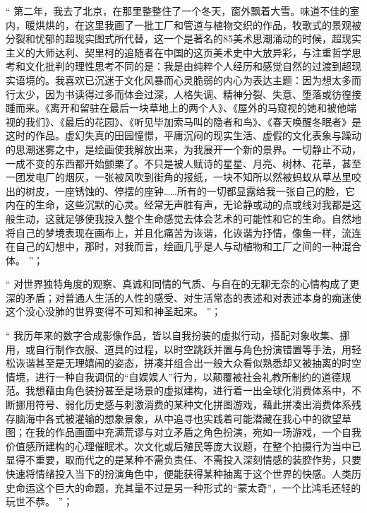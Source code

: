 \documentclass[master,oneside]{zjuthesis}
\begin{document}
“ 第二年，我去了北京，在那里整整住了一个冬天，窗外飘着大雪。味道不佳的室内，暖烘烘的，在这里我画了一批工厂和管道与植物交织的作品，牧歌式的景观被分裂和忧郁的超现实图式所代替，这一个是著名的85美术思潮涌动的时候，超现实主义的大师达利、契里柯的追随者在中国的这页美术史中大放异彩，与注重哲学思考和文化批判的理性思考不同的是：我是由纯粹个人经历和感觉自然的过渡到超现实语境的。我喜欢已沉迷于文化风暴而心灵脆弱的内心为表达主题：因为想太多而行太少，因为书读得过多而体会过深，人格失调、精神分裂、失意、堕落或彷徨接踵而来。《离开和留驻在最后一块草地上的两个人》、《屋外的马窥视的她和被他端视的我们》、《最后的花园》、《听见毕加索马叫的隐者和鸟》、《春天唤醒冬眠者》是这时的作品。虚幻失真的田园憧憬，平庸沉闷的现实生活、虚假的文化表象与躁动的思潮迷雾之中，是绘画使我解放出来，为我展开一个新的景界。一切静止不动，一成不变的东西都开始颤栗了。不只是被人赋诗的星星、月亮、树林、花草，甚至一团发电厂的烟灰，一张被风吹到街角的报纸，一块不知所以然被蚂蚁从草丛里咬出的树皮，一座锈蚀的、停摆的座钟……所有的一切都显露给我一张自己的脸，它内在的生命，这些沉默的心灵。经常无声胜有声，无论静或动的点或线对我都是这般生动，这就足够使我投入整个生命感觉去体会艺术的可能性和它的生命。自然地将自己的梦境表现在画布上，并且化痛苦为诙谐，化诙谐为抒情，像鱼一样，流连在自己的幻想中，那时，对我而言，绘画几乎是人与动植物和工厂之间的一种混合体。 ”；

“ 对世界独特角度的观察、真诚和同情的气质、与自在的无聊无奈的心情构成了更深的矛盾；对普通人生活的人性的感受、对生活常态的表述和对表述本身的痴迷使这个没心没肺的世界变得不可知和神圣起来。 ”；

“ 我历年来的数字合成影像作品，皆以自我扮装的虚拟行动，搭配对象收集、挪用，或自行制作衣服、道具的过程，以时空跳跃并置与角色扮演错置等手法，用轻松诙谐甚至是无理嬉闹的姿态，拼凑并组合出一般大众看似熟悉却又被抽离的时空情境，进行一种自我调侃的“自娱娱人”行为，以颠覆被社会礼教所制约的道德规范。我想藉由角色装扮甚至是场景的虚拟建构，进行着一出全球化消费体系中，不断挪用符号、弱化历史感与刺激消费的某种文化拼图游戏，藉此拼凑出消费体系残存脑海中各式被灌输的想象景象，从中追寻也实践着可能潜藏在我心中的欲望草图；在我的作品画面中充满荒谬与对立矛盾之角色扮演，宛如一场游戏，一个自我价值感所建构的心理催眠术。次文化或后殖民等庞大议题，在整个拍摄行为当中已显得不重要，取而代之的是某种不需负责任、不需投入深刻情感的装腔作势，只要快速将情绪投入当下的扮演角色中，便能获得某种抽离于这个世界的快感。人类历史命运这个巨大的命题，充其量不过是另一种形式的“蒙太奇”，一个比鸿毛还轻的玩世不恭。 ”；
\end{document}
